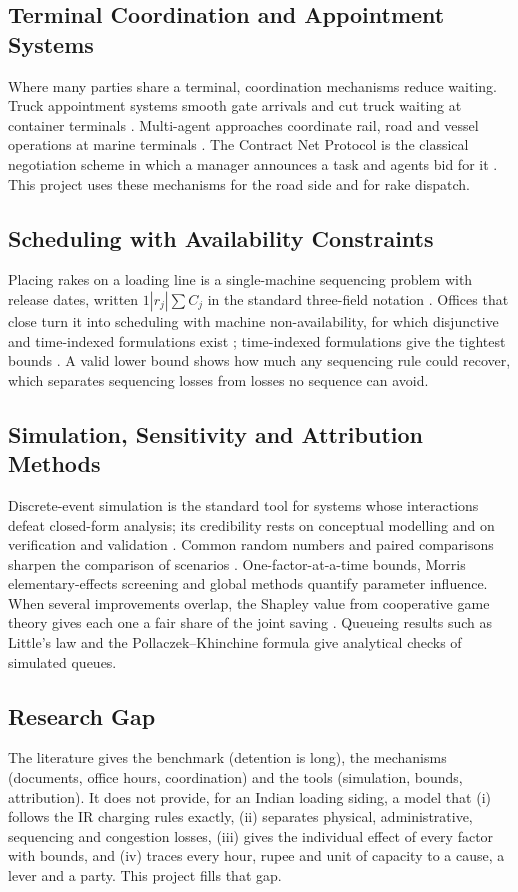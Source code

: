 \subsection{Terminal Coordination and Appointment Systems}
Where many parties share a terminal, coordination mechanisms reduce waiting. Truck appointment systems smooth gate arrivals and cut truck waiting at container terminals \cite{guan}. Multi-agent approaches coordinate rail, road and vessel operations at marine terminals \cite{parmak}. The Contract Net Protocol is the classical negotiation scheme in which a manager announces a task and agents bid for it \cite{smith}. This project uses these mechanisms for the road side and for rake dispatch.

\subsection{Scheduling with Availability Constraints}
Placing rakes on a loading line is a single-machine sequencing problem with release dates, written $1|r_j|\sum C_j$ in the standard three-field notation \cite{graham}. Offices that close turn it into scheduling with machine non-availability, for which disjunctive and time-indexed formulations exist \cite{azem}; time-indexed formulations give the tightest bounds \cite{sousa}. A valid lower bound shows how much any sequencing rule could recover, which separates sequencing losses from losses no sequence can avoid.

\subsection{Simulation, Sensitivity and Attribution Methods}
Discrete-event simulation is the standard tool for systems whose interactions defeat closed-form analysis; its credibility rests on conceptual modelling \cite{robinson} and on verification and validation \cite{sargent}. Common random numbers and paired comparisons sharpen the comparison of scenarios \cite{law}. One-factor-at-a-time bounds, Morris elementary-effects screening \cite{morris, campolongo} and global methods \cite{saltelli} quantify parameter influence. When several improvements overlap, the Shapley value from cooperative game theory gives each one a fair share of the joint saving \cite{shapley}. Queueing results such as Little's law \cite{little} and the Pollaczek--Khinchine formula \cite{gross} give analytical checks of simulated queues.

\subsection{Research Gap}
The literature gives the benchmark (detention is long), the mechanisms (documents, office hours, coordination) and the tools (simulation, bounds, attribution). It does not provide, for an Indian loading siding, a model that (i) follows the IR charging rules exactly, (ii) separates physical, administrative, sequencing and congestion losses, (iii) gives the individual effect of every factor with bounds, and (iv) traces every hour, rupee and unit of capacity to a cause, a lever and a party. This project fills that gap.

